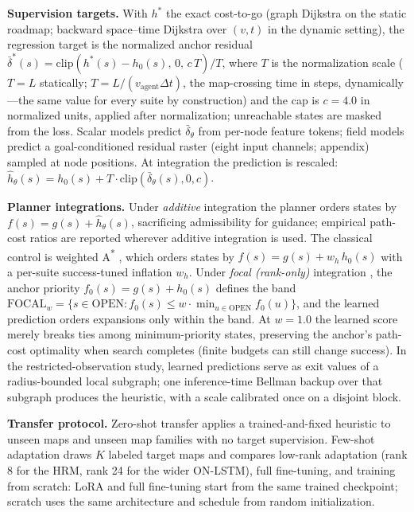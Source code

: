 \documentclass[letterpaper]{article} %
\begin{document}
\textbf{Supervision targets.} With $h^{*}$ the exact cost-to-go (graph Dijkstra on the static roadmap; backward space--time Dijkstra over $(v,t)$ in the dynamic setting), the regression target is the normalized anchor residual $\bar\delta^{*}(s) = \mathrm{clip}\!\left(h^{*}(s) - h_0(s),\, 0,\, c\,T\right)/T$, where $T$ is the normalization scale ($T{=}L$ statically; $T = L/(v_{\mathrm{agent}}\Delta t)$, the map-crossing time in steps, dynamically---the same value for every suite by construction) and the cap is $c{=}4.0$ in normalized units, applied after normalization; unreachable states are masked from the loss. Scalar models predict $\bar\delta_\theta$ from per-node feature tokens; field models predict a goal-conditioned residual raster (eight input channels; appendix) sampled at node positions. At integration the prediction is rescaled: $\hat h_\theta(s) = h_0(s) + T \cdot \mathrm{clip}(\bar\delta_\theta(s), 0, c)$.

\textbf{Planner integrations.} Under \emph{additive} integration the planner orders states by $f(s) = g(s) + \hat h_\theta(s)$, sacrificing admissibility for guidance; empirical path-cost ratios are reported wherever additive integration is used. The classical control is weighted A\textsuperscript{*} \citep{pohl1970}, which orders states by $f(s) = g(s) + w_h\, h_0(s)$ with a per-suite success-tuned inflation $w_h$. Under \emph{focal (rank-only)} integration \citep{pohl1970,pearl1982semiadmissible}, the anchor priority $f_0(s) = g(s) + h_0(s)$ defines the band $\mathrm{FOCAL}_w = \{ s \in \mathrm{OPEN} : f_0(s) \leq w \cdot \min_{u \in \mathrm{OPEN}} f_0(u) \}$, and the learned prediction orders expansions only within the band. At $w{=}1.0$ the learned score merely breaks ties among minimum-priority states, preserving the anchor's path-cost optimality when search completes (finite budgets can still change success). In the restricted-observation study, learned predictions serve as exit values of a radius-bounded local subgraph; one inference-time Bellman backup over that subgraph produces the heuristic, with a scale calibrated once on a disjoint block.

\textbf{Transfer protocol.} Zero-shot transfer applies a trained-and-fixed heuristic to unseen maps and unseen map families with no target supervision. Few-shot adaptation draws $K$ labeled target maps and compares low-rank adaptation \citep[LoRA;][]{hu2021lora} (rank 8 for the HRM, rank 24 for the wider ON-LSTM), full fine-tuning, and training from scratch: LoRA and full fine-tuning start from the same trained checkpoint; scratch uses the same architecture and schedule from random initialization.
\end{document}
